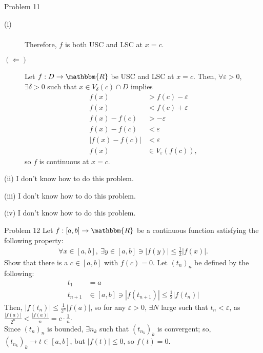 \documentclass[8pt]{extarticle}
\newcommand{\R}{\mathbbm{R}}
\begin{document}
\begin{problem}{Problem 11}
\begin{problem}{(i)}
\begin{description}
\begin{align*}
          \end{align*}
          Therefore, $f$ is both USC and LSC at $x=c$.
        \item[$(\Leftarrow)$] Let $f: D\rightarrow \R$ be USC and LSC at $x=c$. Then, $\forall \varepsilon > 0$, $\exists \delta > 0$ such that $x\in V_{\delta}(c)\cap D$ implies
          \begin{align*}
            f(x) &> f(c) - \varepsilon\\
            f(x) &< f(c) + \varepsilon\\
            f(x) - f(c) &> -\varepsilon\\
            f(x) - f(c) &< \varepsilon\\
            |f(x) - f(c)| &< \varepsilon\\
            f(x) &\in V_{\varepsilon}(f(c)),
          \end{align*}
          so $f$ is continuous at $x=c$.
      \end{description}
    \end{problem}
    \begin{problem}{(ii)}
      I don't know how to do this problem.
    \end{problem}
    \begin{problem}{(iii)}
      I don't know how to do this problem.
    \end{problem}
    \begin{problem}{(iv)}
      I don't know how to do this problem.
    \end{problem}
  \end{problem}
  \begin{problem}{Problem 12}
    Let $f: [a,b] \rightarrow \R$ be a continuous function satisfying the following property:
    \begin{align*}
      \forall x\in [a,b],~\exists y\in[a,b] \ni |f(y)| \leq \frac{1}{2}|f(x)|.
    \end{align*}
    Show that there is a $c\in [a,b]$ with $f(c) = 0$.
    \tcblower
    Let $(t_n)_n$ be defined by the following:
    \begin{align*}
      t_1 &= a\\
      t_{n+1} &\in [a,b] \ni |f(t_{n+1})| \leq \frac{1}{2}|f(t_n)|
    \end{align*}
    Then, $|f(t_n)| \leq \frac{1}{2^n}|f(a)|$, so for any $\varepsilon > 0$, $\exists N$ large such that $t_n < \varepsilon$, as $\frac{|f(a)|}{2^n} < \frac{|f(a)|}{n} = c\cdot \frac{1}{n}$.\\

    Since $(t_n)_n$ is bounded, $\exists n_k$ such that $(t_{n_k})_k$ is convergent; so, $(t_{n_k})_k \rightarrow t\in [a,b]$, but $|f(t)| \leq 0$, so $f(t) = 0$.
  \end{problem}
\end{document}
